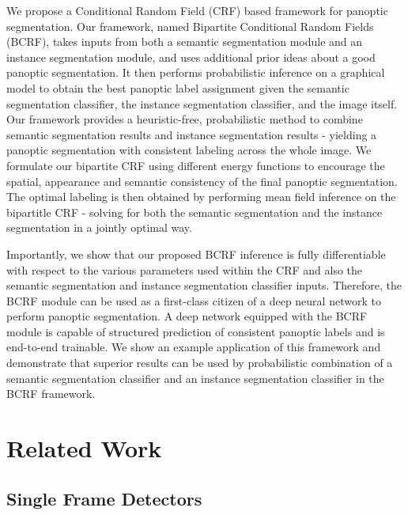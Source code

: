 We propose a Conditional Random Field (CRF) based framework for panoptic segmentation. Our framework, named Bipartite Conditional Random Fields (BCRF), takes inputs from both a semantic segmentation module and an instance segmentation module, and uses additional prior ideas about a good panoptic segmentation. It then performs probabilistic inference on a graphical model to obtain the best panoptic label assignment given the semantic segmentation classifier, the instance segmentation classifier, and the image itself. Our framework provides a heuristic-free, probabilistic method to combine semantic segmentation results and instance segmentation results - yielding a panoptic segmentation with consistent labeling across the whole image. We formulate our bipartite CRF using different energy functions to encourage the spatial, appearance and semantic consistency of the final panoptic segmentation. The optimal labeling is then obtained by performing mean field inference on the bipartitle CRF - solving for both the semantic segmentation and the instance segmentation in a jointly optimal way.

Importantly, we show that our proposed BCRF inference is fully differentiable with respect to the various parameters used within the CRF and also the semantic segmentation and instance segmentation classifier inputs. Therefore, the BCRF module can be used as a first-class citizen of a deep neural network to perform panoptic segmentation. A deep network equipped with the BCRF module is capable of structured prediction of consistent panoptic labels and is end-to-end trainable. We show an example application of this framework and demonstrate that superior results can be used by probabilistic combination of a semantic segmentation classifier and an instance segmentation classifier in the BCRF framework.



\section{Related Work}

\subsection{Single Frame Detectors}

